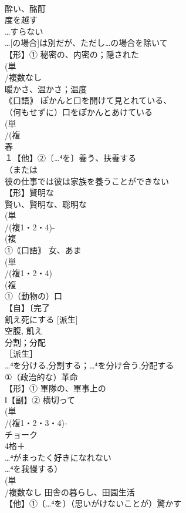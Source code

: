 \documentclass[8pt]{extreport}
\begin{document}
\begin{CJK}{UTF8}{min}
\\	酔い、酩酊
\\	度を越す
\\	…すらない
\\	…[の場合]は別だが、ただし…の場合を除いて
\\	【形】① 秘密の、内密の；隠された 
\\	(単
\\	/複数なし 
\\	暖かさ、温かさ；温度 
\\	｟口語｠ ぽかんと口を開けて見とれている、
\\	（何もせずに）口をぽかんとあけている　
\\	(単
\\	/(複
\\	春 
\\	１【他】②〔…⁴を〕養う、扶養する 
\\	（または
\\	彼の仕事では彼は家族を養うことができない
\\	【形】賢明な 
\\	賢い、賢明な、聡明な
\\	(単
\\	/(複1・2・4)-
\\	(複
\\	①｟口語｠ 女、あま
\\	(単
\\	/(複1・2・4)
\\	(複
\\	①（動物の）口 
\\	【自】〔完了
\\	飢え死にする [派生] 
\\	空腹, 飢え
\\	分割；分配 
\\	［派生］ 
\\	…⁴を分ける,分割する；…⁴を分け合う,分配する
\\	①（政治的な）革命 
\\	【形】① 軍隊の、軍事上の 
\\	Ⅰ【副】② 横切って
\\	(単
\\	/(複1・2・3・4)‐
\\	チョーク 
\\	4格＋
\\	…⁴がまったく好きになれない 
\\	…⁴を我慢する）
\\	(単
\\	/複数なし 田舎の暮らし、田園生活 
\\	【他】①〔…⁴を〕（思いがけないことが）驚かす 

\end{CJK}
\end{document}
